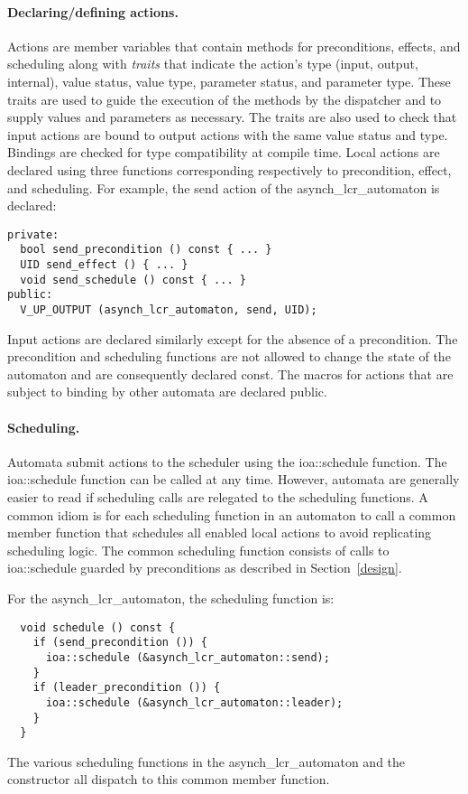\paragraph*{Declaring/defining actions.}
Actions are member variables that contain methods for preconditions, effects, and scheduling along with \emph{traits} that indicate the action's type (input, output, internal), value status, value type, parameter status, and parameter type.
These traits are used to guide the execution of the methods by the dispatcher and to supply values and parameters as necessary.
The traits are also used to check that input actions are bound to output actions with the same value status and type.
Bindings are checked for type compatibility at compile time.
Local actions are declared using three functions corresponding respectively to precondition, effect, and scheduling.
\ifjournal
For example, the send action of the asynch\_lcr\_automaton is declared:
\begin{lstlisting}
private:
  bool send_precondition () const { ... }
  UID send_effect () { ... }
  void send_schedule () const { ... }
public:
  V_UP_OUTPUT (asynch_lcr_automaton, send, UID);
\end{lstlisting}
\fi
Input actions are declared similarly except for the absence of a precondition.
The precondition and scheduling functions are not allowed to change the state of the automaton and are consequently declared const.
The macros for actions that are subject to binding by other automata are declared public.

\paragraph*{Scheduling.}
Automata submit actions to the scheduler using the ioa::schedule function.
The ioa::schedule function can be called at any time.
However, automata are generally easier to read if scheduling calls are relegated to the scheduling functions.
A common idiom is for each scheduling function in an automaton to call a common member function that schedules all enabled local actions to avoid replicating scheduling logic.
The common scheduling function consists of calls to ioa::schedule guarded by preconditions as described in Section~\ref{design}.

\ifjournal
For the asynch\_lcr\_automaton, the scheduling function is:
\begin{lstlisting}
  void schedule () const {
    if (send_precondition ()) {
      ioa::schedule (&asynch_lcr_automaton::send);
    }
    if (leader_precondition ()) {
      ioa::schedule (&asynch_lcr_automaton::leader);
    }
  }
\end{lstlisting}
The various scheduling functions in the asynch\_lcr\_automaton and the constructor all dispatch to this common member function.
\fi

